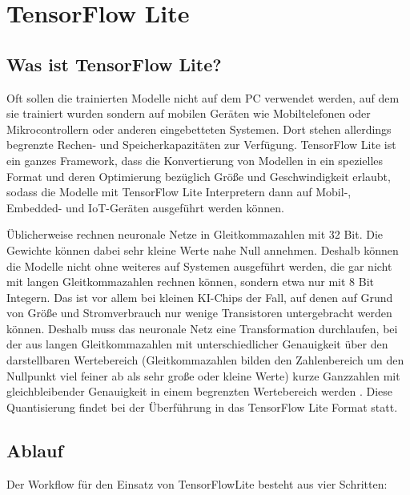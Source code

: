 %
%
%


\chapter{TensorFlow Lite}

\section{Was ist TensorFlow Lite?}
Oft sollen die trainierten Modelle nicht auf dem PC verwendet werden, auf dem sie trainiert wurden sondern auf mobilen Geräten wie Mobiltelefonen
oder Mikrocontrollern oder anderen eingebetteten Systemen. Dort stehen allerdings begrenzte Rechen- und Speicherkapazitäten zur Verfügung.
TensorFlow Lite ist ein ganzes Framework, dass die Konvertierung von Modellen in ein spezielles Format und deren Optimierung bezüglich Größe
 und Geschwindigkeit erlaubt, sodass die Modelle mit TensorFlow Lite Interpretern dann auf Mobil-, Embedded- und IoT-Geräten ausgeführt werden 
 können. \cite{Google.09.10.2020}\cite{Warden:2020}
 
 Üblicherweise rechnen neuronale Netze in Gleitkommazahlen mit 32 Bit. Die Gewichte können dabei sehr kleine Werte nahe Null annehmen. 
 Deshalb können die Modelle nicht ohne weiteres auf Systemen ausgeführt werden, die gar nicht mit langen Gleitkommazahlen rechnen können, 
 sondern etwa nur mit 8 Bit Integern. Das ist vor allem bei kleinen KI-Chips der Fall, auf denen auf Grund von Größe und Stromverbrauch nur 
 wenige Transistoren untergebracht werden können. Deshalb muss das neuronale Netz eine Transformation durchlaufen, \glqq bei der aus langen Gleitkommazahlen
mit unterschiedlicher Genauigkeit über den darstellbaren Wertebereich (Gleitkommazahlen bilden den Zahlenbereich um den Nullpunkt viel feiner
ab als sehr große oder kleine Werte) kurze Ganzzahlen mit gleichbleibender Genauigkeit in einem begrenzten Wertebereich werden \grqq \cite{Heise:2020}.
Diese Quantisierung findet bei der Überführung in das TensorFlow Lite Format statt.
 
\section{Ablauf}
 
Der Workflow für den Einsatz von TensorFlowLite besteht aus vier Schritten:
 
